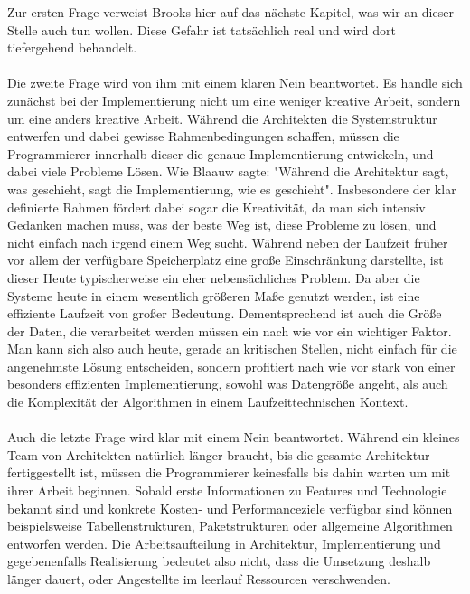 \documentclass[a4paper, ngerman, 12pt, usenames, dvipsnames]{article}
\begin{document}
Zur ersten Frage verweist Brooks hier auf das nächste Kapitel, was wir an dieser Stelle auch tun wollen. Diese Gefahr ist tatsächlich real und wird dort tiefergehend behandelt.
\\
\\
\noindent Die zweite Frage wird von ihm mit einem klaren Nein beantwortet. Es handle sich zunächst bei der Implementierung nicht um eine weniger kreative Arbeit, sondern um eine anders kreative Arbeit. Während die Architekten die Systemstruktur entwerfen und dabei gewisse Rahmenbedingungen schaffen, müssen die Programmierer innerhalb dieser die genaue Implementierung entwickeln, und dabei viele Probleme Lösen. Wie Blaauw sagte: "Während die Architektur sagt, was geschieht, sagt die Implementierung, wie es geschieht". Insbesondere der klar definierte Rahmen fördert dabei sogar die Kreativität, da man sich intensiv Gedanken machen muss, was der beste Weg ist, diese Probleme zu lösen, und nicht einfach nach irgend einem Weg sucht. Während neben der Laufzeit früher vor allem der verfügbare Speicherplatz eine große Einschränkung darstellte, ist dieser Heute typischerweise ein eher nebensächliches Problem. Da aber die Systeme heute in einem wesentlich größeren Maße genutzt werden, ist eine effiziente Laufzeit von großer Bedeutung. Dementsprechend ist auch die Größe der Daten, die verarbeitet werden müssen ein nach wie vor ein wichtiger Faktor. Man kann sich also auch heute, gerade an kritischen Stellen, nicht einfach für die angenehmste Lösung entscheiden, sondern profitiert nach wie vor stark von einer besonders effizienten Implementierung, sowohl was Datengröße angeht, als auch die Komplexität der Algorithmen in einem Laufzeittechnischen Kontext.
\\
\\
\noindent Auch die letzte Frage wird klar mit einem Nein beantwortet. Während ein kleines Team von Architekten natürlich länger braucht, bis die gesamte Architektur fertiggestellt ist, müssen die Programmierer keinesfalls bis dahin warten um mit ihrer Arbeit beginnen. Sobald erste Informationen zu Features und Technologie bekannt sind und konkrete Kosten- und Performanceziele verfügbar sind können beispielsweise Tabellenstrukturen, Paketstrukturen oder allgemeine Algorithmen entworfen werden. Die Arbeitsaufteilung in Architektur, Implementierung und gegebenenfalls Realisierung bedeutet also nicht, dass die Umsetzung deshalb länger dauert, oder Angestellte im leerlauf Ressourcen verschwenden. 
\end{document}
